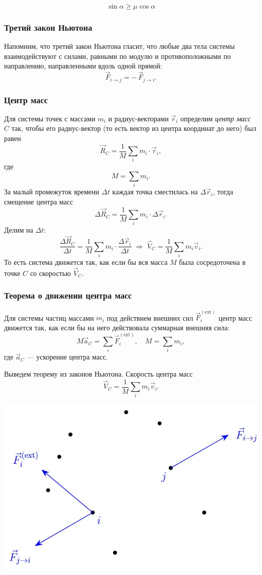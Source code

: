 \documentclass[12pt, a4paper]{article}%
\begin{document}
\[
\sin\alpha \geq \mu\cos\alpha
\]

\subsubsection*{Третий закон Ньютона}
Напомним, что третий закон Ньютона гласит, что любые два тела системы взаимодействуют с силами, равными по модулю и противоположными по направлению, направленными вдоль одной прямой:
\[
\vec F_{i\to j} = -\,\vec F_{j\to i}.
\]


\subsubsection*{Центр масс}
Для системы точек с массами $m_i$ и радиус-векторами $\vec r_i$ определим \textit{центр масс} $C$ так, чтобы его радиус-вектор (то есть вектор из центра координат до него) был равен
\[
\vec R_C = \frac{1}{M}\sum_i m_i\cdot\vec r_i,
\]
где \[M=\sum_i m_i.\]
За малый промежуток времени $\Delta t$ каждая точка сместилась на $\Delta\vec r_i$, тогда смещение центра масс
\[
\Delta\vec R_C = \frac{1}{M}\sum_i m_i\cdot\Delta\vec r_i.
\]
Делим на $\Delta t$:
\[
\frac{\Delta\vec R_C}{\Delta t} = \frac{1}{M}\sum_i m_i\cdot\frac{\Delta\vec r_i}{\Delta t}
\;\Longrightarrow\;
\vec V_C = \frac{1}{M}\sum_i m_i\vec v_i.
\]
То есть система движется так, как если бы вся масса $M$ была сосредоточена в точке $C$ со скоростью $\vec V_C$.



\subsubsection*{Теорема о движении центра масс}
Для системы частиц массами \(m_i\) под действием внешних сил
\(\vec F_i^{\mathrm{(ext)}}\) центр масс движется так, как если бы на него
действовала суммарная внешняя сила:
\[
M\vec a_C = \sum_i \vec F_i^{\mathrm{(ext)}}, 
\quad M=\sum_i m_i,
\]
где \(\vec a_C\) — ускорение центра масс.

Выведем теорему из законов Ньютона. 
Скорость центра масс \[\vec V_C = \frac1M\sum_i m_i\vec v_i.\]  


\begin{center}
\includegraphics[width=0.53\linewidth]{9newton2.jpeg}
\label{fig:mpr}
\end{center}
\end{document}
